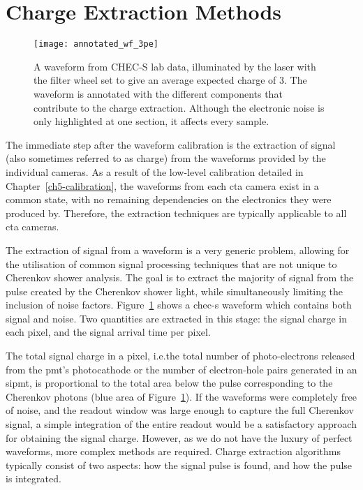 \section{Charge Extraction Methods}

\begin{figure}
	\centering
    \texttt{[image: annotated\_wf\_3pe]} 
	\caption[Annotated waveform.]{A waveform from CHEC-S lab data, illuminated by the laser with the filter wheel set to give an average expected charge of \SI{3}{\pe}. The waveform is annotated with the different components that contribute to the charge extraction. Although the electronic noise is only highlighted at one section, it affects every sample.}
	\label{fig:annotated_wf_3pe}
\end{figure}

The immediate step after the waveform calibration is the extraction of signal (also sometimes referred to as charge) from the waveforms provided by the individual cameras. As a result of the low-level calibration detailed in Chapter~\ref{ch5-calibration}, the waveforms from each \gls{cta} camera exist in a common state, with no remaining dependencies on the electronics they were produced by. Therefore, the extraction techniques are typically applicable to all \gls{cta} cameras. 

The extraction of signal from a waveform is a very generic problem, allowing for the utilisation of common signal processing techniques that are not unique to Cherenkov shower analysis. The goal is to extract the majority of signal from the pulse created by the Cherenkov shower light, while simultaneously limiting the inclusion of noise factors. Figure~\ref{fig:annotated_wf_3pe} shows a \gls{chec-s} waveform which contains both signal and noise. Two quantities are extracted in this stage: the signal charge in each pixel, and the signal arrival time per pixel. 

The total signal charge in a pixel, i.e.\@ the total number of photo-electrons released from the \gls{pmt}'s photocathode or the number of electron-hole pairs generated in an \gls{sipmt}, is proportional to the total area below the pulse corresponding to the Cherenkov photons (blue area of Figure~\ref{fig:annotated_wf_3pe}). If the waveforms were completely free of noise, and the readout window was large enough to capture the full Cherenkov signal, a simple integration of the entire readout would be a satisfactory approach for obtaining the signal charge. However, as we do not have the luxury of perfect waveforms, more complex methods are required. Charge extraction algorithms typically consist of two aspects: how the signal pulse is found, and how the pulse is integrated.


